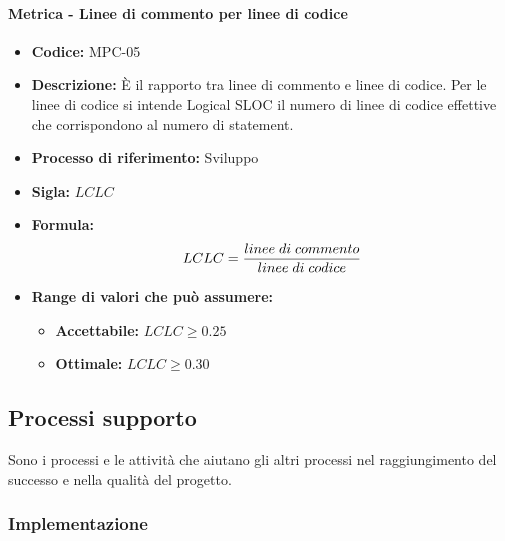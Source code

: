     \paragraph{Metrica - Linee di commento per linee di codice}
    \begin{itemize}
        \item \textbf{Codice:} MPC-05
        \item \textbf{Descrizione:} È il rapporto tra linee di commento e linee di codice. Per le linee di codice si intende Logical SLOC il numero di linee di codice effettive che corrispondono al numero di statement.
        \item \textbf{Processo di riferimento:} Sviluppo
        \item \textbf{Sigla:} $LCLC$
        \item \textbf{Formula:}$$LCLC = {linee \; di \; commento\over linee \; di \; codice}$$
        \item \textbf{Range di valori che può assumere:}
        \begin{itemize}
            \item \textbf{Accettabile:} $LCLC \geq 0.25$
            \item \textbf{Ottimale:} $LCLC \geq 0.30$
        \end{itemize}
    \end{itemize}

\subsection{Processi supporto}
Sono i processi e le attività che aiutano gli altri processi nel raggiungimento del successo e nella qualità del progetto.
  
\subsubsection{Implementazione}
